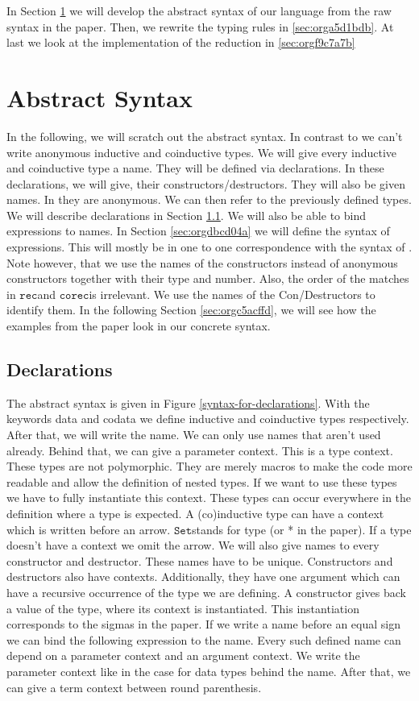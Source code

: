 \documentclass[a4paper,cleardoubleempty,BCOR1cm]{scrbook}
\begin{document}
In Section \ref{sec:org9120160} we will develop the abstract syntax of our language
from the raw syntax in the paper. Then, we rewrite the typing rules in \ref{sec:orga5d1bdb}. At last we look at the implementation of the reduction in \ref{sec:orgf9c7a7b}
\section{Abstract Syntax}
\label{sec:org9120160}
In the following, we will scratch out the abstract syntax. In contrast to
\cite{basold2016type} we can't write anonymous inductive and coinductive types.
We will give every inductive and coinductive type a name. They will be
defined via declarations. In these declarations, we will give, their
constructors/destructors. They will also be given names. In \cite{basold2016type}
they are anonymous. We can then refer to the previously defined types. We
will describe declarations in Section \ref{sec:orgf762281}. We will also be able to
bind expressions to names. In Section \ref{sec:orgdbcd04a} we will define the syntax
of expressions. This will mostly be in one to one correspondence with the
syntax of \cite{basold2016type}. Note however, that we use the names of the
constructors instead of anonymous constructors together with their type and
number. Also, the order of the matches in $\mathtt{rec}$\;and $\mathtt{corec}$\;is irrelevant. We use
the names of the Con/Destructors to identify them. In the following Section
\ref{sec:orgc5acffd}, we will see how the examples from the paper look in our concrete
syntax.
\subsection{Declarations}
\label{sec:orgf762281}
The abstract syntax is given in Figure \ref{syntax-for-declarations}. With the
keywords data and codata we define inductive and coinductive types
respectively. After that, we will write the name. We can only use names that
aren't used already. Behind that, we can give a parameter context. This is a
type context. These types are not polymorphic. They are merely macros to make
the code more readable and allow the definition of nested types. If we want
to use these types we have to fully instantiate this context. These types can
occur everywhere in the definition where a type is expected. A (co)inductive
type can have a context which is written before an arrow. $\mathtt{Set}$\;stands for
type (or * in the paper). If a type doesn't have a context we omit the arrow.
We will also give names to every constructor and destructor. These names have
to be unique. Constructors and destructors also have contexts. Additionally,
they have one argument which can have a recursive occurrence of the type we
are defining. A constructor gives back a value of the type, where its
context is instantiated. This instantiation corresponds to the sigmas in the
paper. If we write a name before an equal sign we can bind the following
expression to the name. Every such defined name can depend on a parameter
context and an argument context. We write the parameter context like in the
case for data types behind the name. After that, we can give a term context
between round parenthesis.
\end{document}
